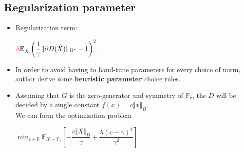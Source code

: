 \documentclass[landscape,headrule,footrule]{foils}
\begin{document}
\subsection{Regularization parameter}
\tableofcontents
\begin{frame}
\begin{flushleft}
\begin{itemize}
\item Regularization term:
\begin{center}
$ \textcolor{red}{\lambda} \mathbb{E}_{\hat{X}} \left(\dfrac{1}{\textcolor{red}{\gamma}} \Vert \partial D(\hat{X})\Vert_{B^*} - 1 \right)^2$. \\
\end{center}
\item In order to avoid having to hand-tune parameters for every choice of norm, author derive some \textbf{heuristic parameter} choice rules. \\
\item Assuming that $G$ is the zero-generator and symmetry of $\mathbb{P}_r$, the $D$ will be decided by a single constant $f(x) = c \Vert x \Vert_B$. \\
We can form the optimization problem
\begin{center}
$\mathop{\min}_{c \in \mathbb{R}} \mathbb{E}_{X \sim \mathbb{P}_r} \left[-\dfrac{c \Vert X \Vert_B}{\gamma} + \dfrac{\lambda(c- \gamma)^2}{\gamma^2} \right]$.
\end{center}

\end{itemize}
\end{flushleft}
\end{frame}
\end{document}
